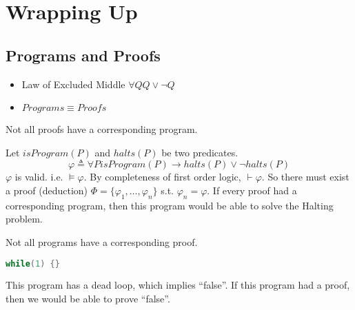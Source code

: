 \chapter{Wrapping Up}

\section{Programs and Proofs}

\begin{itemize}
    \item Law of Excluded Middle $\forall{Q} Q\vee\neg Q$
    \item $Programs \equiv Proofs$
\end{itemize}

Not all proofs have a corresponding program.

Let $isProgram(P)$ and $halts(P)$ be two predicates.
\[ \varphi \triangleq \forall{P} isProgram(P) \to halts(P) \vee \neg halts(P) \]
$\varphi$ is valid. i.e. $\vDash\varphi$. By completeness of first order logic, $\vdash\varphi$. So there must exist a proof (deduction) $\Phi=\{\varphi_1,\dots,\varphi_n\}$ s.t. $\varphi_n = \varphi$. If every proof had a corresponding program, then this program would be able to solve the Halting problem.

Not all programs have a corresponding proof.

\begin{lstlisting}[language=c]
    while(1) {}
\end{lstlisting}

This program has a dead loop, which implies ``false''. If this program had a proof, then we would be able to prove ``false''.
